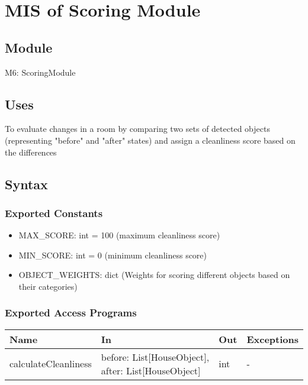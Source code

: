 \documentclass[12pt, titlepage]{article}
\begin{document}
\newpage

\section{MIS of Scoring Module} \label{Module} 

\subsection{Module}

M6: ScoringModule

\subsection{Uses}
To evaluate changes in a room by comparing two sets of detected objects (representing "before" and "after" states) and assign a cleanliness score based on the differences

\subsection{Syntax}

\subsubsection{Exported Constants}

\begin{itemize}
  \item MAX{\_}SCORE: int = 100 (maximum cleanliness score)
  \item MIN{\_}SCORE: int = 0 (minimum cleanliness score)
  \item OBJECT{\_}WEIGHTS: dict (Weights for scoring different objects based on their categories)
\end{itemize}

\subsubsection{Exported Access Programs}

\begin{center}
\begin{tabular}{p{5cm} p{3cm} p{3cm} p{2cm}}
\hline
\textbf{Name} & \textbf{In} & \textbf{Out} & \textbf{Exceptions} \\
\hline
calculateCleanliness & before: List[HouseObject], after: List[HouseObject] & int & - \\
\hline
\end{tabular}
\end{center}
\end{document}
